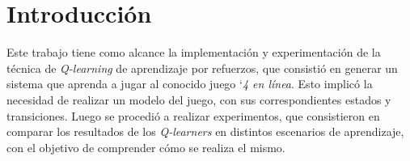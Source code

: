 \section{Introducción}
Este trabajo tiene como alcance la implementaci\'on y experimentaci\'on de la t\'ecnica de  \emph{Q-learning} de aprendizaje por refuerzos, que consisti\'o en generar un sistema que aprenda a jugar al conocido juego `\emph{4 en l\'inea}.
Esto implic\'o la necesidad de realizar un modelo del juego, con sus correspondientes estados y transiciones. 
Luego se procedi\'o a realizar experimentos, que consistieron en comparar los resultados de los \emph{Q-learners} en distintos escenarios de aprendizaje, con el objetivo de comprender cómo se realiza el mismo.
